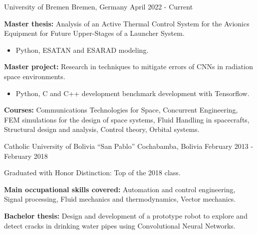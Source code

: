 

\begin{cventries}
  {University of Bremen}
  {Bremen, Germany}
  {April 2022 - Current}
  {
    \begin{cvitems}
      \item \textbf{Master thesis:} Analysis of an Active Thermal
      Control System for the Avionics Equipment for Future
      Upper-Stages of a Launcher System.
      \begin{itemize}
        \item[\bullet] Python, ESATAN and ESARAD modeling. 
      \end{itemize}
      \item \textbf{Master project:} Research in techniques to
      mitigate errors of CNNs in radiation space environments.
      \begin{itemize}
        \item[\bullet] Python, C and C++ development benchmark
        development with Tensorflow. 
      \end{itemize}
      \item \textbf{Courses:} Communications Technologies for Space,
      Concurrent Engineering, FEM simulations for the design of space
      systems, Fluid Handling in spacecrafts, Structural design and
      analysis, Control theory, Orbital systems.
    \end{cvitems}
  }

  {Catholic University of Bolivia ``San Pablo''}
  {Cochabamba, Bolivia}
  {February 2013 - February 2018}
  {
    \begin{cvitems}
      \item Graduated with Honor Distinction: Top of the 2018 class.
      \item \textbf{Main occupational skills covered:} Automation and
      control engineering, Signal processing, Fluid mechanics and
      thermodynamics, Vector mechanics.
      \item \textbf{Bachelor thesis:} Design and development of a
      prototype robot to explore and detect cracks in drinking water
      pipes using Convolutional Neural Networks.
    \end{cvitems}
  }


\end{cventries}
